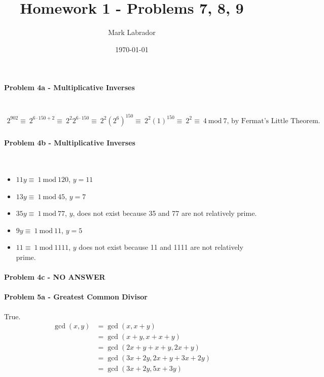 \documentclass[fleqn]{article}
\title{Homework 1 - Problems 7, 8, 9}
\author{Mark Labrador}
\date{\today}
\begin{document}
\maketitle
\paragraph{Problem 4a - Multiplicative Inverses} ~\\
\begin{align*}
2^{902} \equiv\ 2^{6\cdot150 + 2} \equiv\ 2^{2}2^{6\cdot150} \equiv\ 2^{2}(2^{6})^{150} \equiv\ 2^{2}(1)^{150} \equiv\ 2^2 \equiv\ 4\ \textrm{mod}\ 7\text{, by Fermat's Little Theorem.}
\end{align*}

\paragraph{Problem 4b - Multiplicative Inverses} ~\\
\begin{itemize}
	\item $11y \equiv\ 1\ \textrm{mod}\ 120$, $y=11$
	\item $13y \equiv\ 1\ \textrm{mod}\ 45$, $y=7$
	\item $35y \equiv\ 1\ \textrm{mod}\ 77$, $y$, does not exist because 35 and 77 are not relatively prime.
	\item $9y \equiv\ 1\ \textrm{mod}\ 11$, $y=5$
	\item $11 \equiv\ 1\ \textrm{mod}\ 1111$, $y$ does not exist because 11 and 1111 are not relatively prime.
\end{itemize}

\paragraph{Problem 4c - NO ANSWER}

\paragraph{Problem 5a - Greatest Common Divisor}
True.
\begin{align*}
\gcd{(x,y)} &= \gcd{(x, x+y)}\\
&= \gcd{(x+y, x+x+y)}\\
&= \gcd{(2x+y+x+y, 2x+y)}\\
&= \gcd{(3x+2y,2x+y+3x+2y)}\\
&= \gcd{(3x+2y,5x+3y)}
\end{align*}
\end{document}
